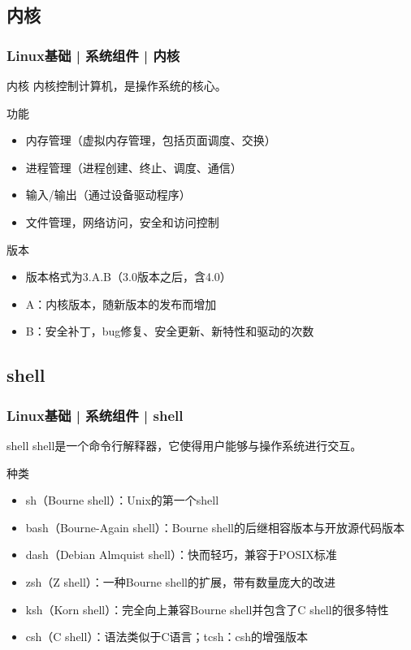 \subsection{内核}
\begin{frame}
  \frametitle{Linux基础 | 系统组件 | 内核}
  \begin{block}{内核}
    内核控制计算机，是操作系统的核心。
  \end{block}
  \pause
  \begin{block}{功能}
  \begin{itemize}
    \item 内存管理（虚拟内存管理，包括页面调度、交换）
    \item 进程管理（进程创建、终止、调度、通信）
    \item 输入/输出（通过设备驱动程序）
    \item 文件管理，网络访问，安全和访问控制
  \end{itemize}
  \end{block}
  \pause
  \begin{block}{版本}
  \begin{itemize}
    \item 版本格式为3.A.B（3.0版本之后，含4.0）
    \item A：内核版本，随新版本的发布而增加
    \item B：安全补丁，bug修复、安全更新、新特性和驱动的次数
  \end{itemize}
  \end{block}
\end{frame}

\subsection{shell}
\begin{frame}
  \frametitle{Linux基础 | 系统组件 | shell}
  \begin{block}{shell}
    shell是一个命令行解释器，它使得用户能够与操作系统进行交互。
  \end{block}
  \pause
  \begin{block}{\alert{种类}}
  \begin{itemize}[<+->]
    \item sh（Bourne shell）：Unix的第一个shell
    \item bash（Bourne-Again shell）：Bourne shell的后继相容版本与开放源代码版本
    \item dash（Debian Almquist shell）：快而轻巧，兼容于POSIX标准
    \item zsh（Z shell）：一种Bourne shell的扩展，带有数量庞大的改进
    \item ksh（Korn shell）：完全向上兼容Bourne shell并包含了C shell的很多特性
    \item csh（C shell）：语法类似于C语言；tcsh：csh的增强版本
  \end{itemize}
  \end{block}
\end{frame}

